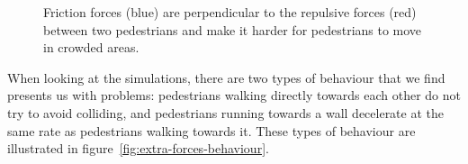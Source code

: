 \begin{figure}[hb]
    \centering
    \caption[Friction forces]{Friction forces (blue) are perpendicular to the
    repulsive forces (red) between two pedestrians and make it harder for
    pedestrians to move in crowded areas.}
    \label{fig:friction}
\end{figure}

When looking at the simulations, there are two types of behaviour that we find
presents us with problems: pedestrians walking directly towards each other do
not try to avoid colliding, and pedestrians running towards a wall decelerate
at the same rate as pedestrians walking towards it. These types of behaviour
are illustrated in figure~\ref{fig:extra-forces-behaviour}.

